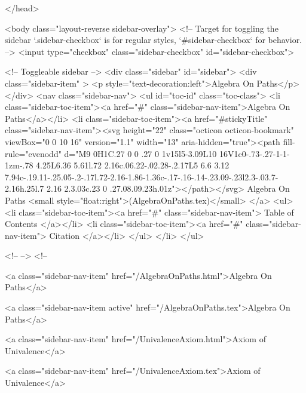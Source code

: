 </head>


  <body class="layout-reverse sidebar-overlay">
    <!-- Target for toggling the sidebar `.sidebar-checkbox` is for regular
     styles, `#sidebar-checkbox` for behavior. -->
<input type="checkbox" class="sidebar-checkbox" id="sidebar-checkbox">

<!-- Toggleable sidebar -->
<div class="sidebar" id="sidebar">
  <div class="sidebar-item" >
    <p style="text-decoration:left">Algebra On Paths</p>
  </div>
  <nav class="sidebar-nav">
    <ul id="toc-id" class="toc-class">
  <li class="sidebar-toc-item"><a href="#" class="sidebar-nav-item">Algebra On Paths</a></li>
  <li class="sidebar-toc-item"><a href="#stickyTitle" class="sidebar-nav-item"><svg height="22" class="octicon octicon-bookmark" viewBox="0 0 10 16" version="1.1" width="13" aria-hidden="true"><path fill-rule="evenodd" d="M9 0H1C.27 0 0 .27 0 1v15l5-3.09L10 16V1c0-.73-.27-1-1-1zm-.78 4.25L6.36 5.61l.72 2.16c.06.22-.02.28-.2.17L5 6.6 3.12 7.94c-.19.11-.25.05-.2-.17l.72-2.16-1.86-1.36c-.17-.16-.14-.23.09-.23l2.3-.03.7-2.16h.25l.7 2.16 2.3.03c.23 0 .27.08.09.23h.01z"></path></svg> Algebra On Paths <small style="float:right">(AlgebraOnPaths.tex)</small>
</a>
    <ul>
      <li class="sidebar-toc-item"><a href="#" class="sidebar-nav-item"> Table of Contents </a></li>
      <li class="sidebar-toc-item"><a href="#" class="sidebar-nav-item"> Citation </a></li>
    </ul>
  </li>
</ul>


    <!--  -->
    <!-- 
      
    
      
    
      
    
      
        
      
    
      
        
          <a class="sidebar-nav-item" href="/AlgebraOnPaths.html">Algebra On Paths</a>
        
      
    
      
        
          <a class="sidebar-nav-item active" href="/AlgebraOnPaths.tex">Algebra On Paths</a>
        
      
    
      
        
          <a class="sidebar-nav-item" href="/UnivalenceAxiom.html">Axiom of Univalence</a>
        
      
    
      
        
          <a class="sidebar-nav-item" href="/UnivalenceAxiom.tex">Axiom of Univalence</a>
        
